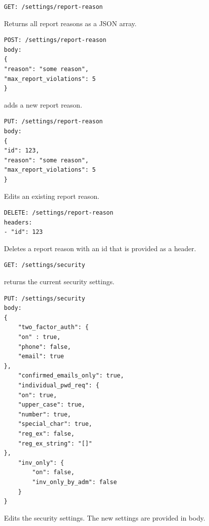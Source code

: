 \begin{verbatim}
GET: /settings/report-reason
\end{verbatim}

Returns all report reasons as a JSON array.

\begin{verbatim}
POST: /settings/report-reason
body:
{
"reason": "some reason",
"max_report_violations": 5
}
\end{verbatim}
adds a new report reason.

\begin{verbatim}
PUT: /settings/report-reason
body:
{
"id": 123,
"reason": "some reason",
"max_report_violations": 5
}
\end{verbatim}
Edits an existing report reason.


\begin{verbatim}
DELETE: /settings/report-reason
headers:
- "id": 123
\end{verbatim}

Deletes a report reason with an id that is provided as a header.

\begin{verbatim}
GET: /settings/security
\end{verbatim}

returns the current security settings.

\begin{verbatim}
PUT: /settings/security
body:
{
    "two_factor_auth": {
    "on" : true,
    "phone": false,
    "email": true
},
    "confirmed_emails_only": true,
    "individual_pwd_req": {
    "on": true,
    "upper_case": true,
    "number": true,
    "special_char": true,
    "reg_ex": false,
    "reg_ex_string": "[]"
},
    "inv_only": {
        "on": false,
        "inv_only_by_adm": false
    }
}
\end{verbatim}
Edits the security settings.
The new settings are provided in body.

